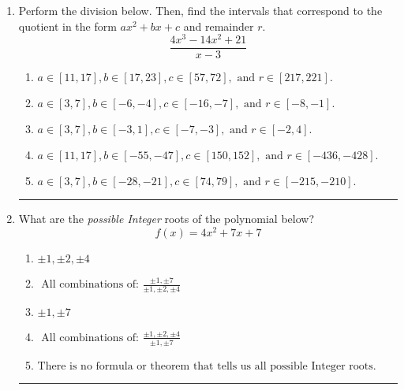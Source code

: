\documentclass[14pt]{extbook}
\newcommand{\litem}[1]{\item#1\hspace*{-1cm}\rule{\textwidth}{0.4pt}}
\begin{document}
\begin{enumerate}
{\begin{enumerate}[label=\Alph*.]
\end{enumerate} }
\litem{
Perform the division below. Then, find the intervals that correspond to the quotient in the form $ax^2+bx+c$ and remainder $r$.\[ \frac{4x^{3} -14 x^{2} + 21}{x -3} \]\begin{enumerate}[label=\Alph*.]
\item \( a \in [11, 17], b \in [17, 23], c \in [57, 72], \text{ and } r \in [217, 221]. \)
\item \( a \in [3, 7], b \in [-6, -4], c \in [-16, -7], \text{ and } r \in [-8, -1]. \)
\item \( a \in [3, 7], b \in [-3, 1], c \in [-7, -3], \text{ and } r \in [-2, 4]. \)
\item \( a \in [11, 17], b \in [-55, -47], c \in [150, 152], \text{ and } r \in [-436, -428]. \)
\item \( a \in [3, 7], b \in [-28, -21], c \in [74, 79], \text{ and } r \in [-215, -210]. \)

\end{enumerate} }
\litem{
What are the \textit{possible Integer} roots of the polynomial below?\[ f(x) = 4x^{2} +7 x + 7 \]\begin{enumerate}[label=\Alph*.]
\item \( \pm 1,\pm 2,\pm 4 \)
\item \( \text{ All combinations of: }\frac{\pm 1,\pm 7}{\pm 1,\pm 2,\pm 4} \)
\item \( \pm 1,\pm 7 \)
\item \( \text{ All combinations of: }\frac{\pm 1,\pm 2,\pm 4}{\pm 1,\pm 7} \)
\item \( \text{There is no formula or theorem that tells us all possible Integer roots.} \)

\end{enumerate} }
\end{enumerate}
\end{document}

